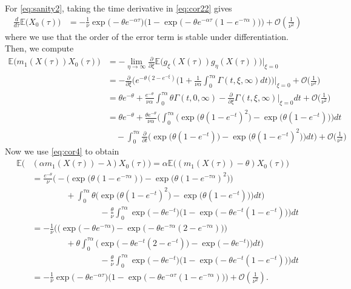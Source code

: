 \documentclass{imsart}
\theoremstyle{plain}
\theoremstyle{definition}
\begin{document}
For \eqref{eq:sanity2}, taking the time derivative in \eqref{eq:cor22}  gives
\begin{align*}
\frac{d}{d\tau}\mathbb E\big(X_0(\tau)\big) & = - \frac1{\nu} \exp\Big(-\theta e^{-\alpha\tau}\Big) \Big( 1 - \exp\Big(- \theta e^{-\alpha\tau}(1 - e^{-\tau\alpha})\Big)  \Big) + \mathcal O\left(\frac{1}{\nu^2}\right)    
\end{align*}
where we use that the order of   the error term is stable under differentiation. Then, we compute
\begin{align*}
    \mathbb E\big(m_1(X(\tau)) X_0(\tau)\big) & = - \lim_{\eta \to\infty} \frac{\partial}{\partial\xi} \mathbb E\big(g_\xi(X(\tau))g_\eta(X(\tau))\big) \Big|_{\xi = 0} \\ & = - \frac{\partial}{\partial\xi} \Big( e^{-\theta(2 - e^{-\xi})}\Big(1  + \frac{1}{\nu \alpha} \int_0^{\tau\alpha} \Gamma(t, \xi, \infty) dt \Big) \Big)\Big|_{\xi = 0} + \mathcal O\Big(\frac{1}{\nu^2}\Big) \\ & = \theta e^{-\theta} + \frac{e^{-\theta}}{\nu \alpha} \int_0^{\tau\alpha} \theta \Gamma(t,0,\infty) - \frac{\partial}{\partial\xi} \Gamma(t,\xi,\infty)\Big|_{\xi = 0} dt + \mathcal O\Big(\frac{1}{\nu^2}\Big)
    \\ & = \theta e^{-\theta} + \frac{\theta e^{-\theta}}{\nu \alpha} \Big( \int_0^{\tau\alpha} \Big( \exp\Big(\theta(1 - e^{-t})^2\Big) - \exp\Big(\theta(1 - e^{-t}) \Big) \Big) dt \\ & \quad - \! \int_0^{\tau\alpha} \frac{\partial}{\partial t} \Big( \exp\Big(\theta(1 - e^{-t})\Big) - \exp\Big(\theta(1 - e^{-t})^2 \Big)\Big) dt \Big) + \mathcal O\Big(\frac{1}{\nu^2}\Big)
\end{align*}
Now we use \eqref{eq:cor4} to obtain
\begin{align*}
\mathbb E\big( & (\alpha m_1(X(\tau)) - \lambda)X_0(\tau)\big) = \alpha \mathbb E\big((m_1(X(\tau)) - \theta)X_0(\tau)\big) \\ 
& 
= \frac{e^{-\theta}}{\nu} \Big( - \Big( \exp\Big(\theta(1 - e^{-\tau\alpha})\Big) - \exp\Big(\theta(1 - e^{-\tau\alpha})^2 \Big)\Big) \\ & \qquad \qquad + \int_0^{\tau\alpha} \theta \Big( \exp\Big(\theta(1 - e^{-t})^2\Big) - \exp\Big(\theta(1 - e^{-t}) \Big) \Big) dt
\Big) \\ &  \qquad \qquad \qquad \qquad - \frac{\theta}{\nu} \int_0^{\tau \alpha} \exp\Big(-\theta e^{-t}\Big)\Big(1 - \exp\Big(-\theta e^{-t}(1 - e^{-t})\Big)\Big) dt
\\ &
= - \frac{1}{\nu} \Big( \Big( \exp\Big(- \theta e^{-\tau\alpha}\Big) - \exp\Big(-\theta e^{-\tau\alpha}(2  - e^{-\tau\alpha}) \Big)\Big) \\ & \qquad \qquad + \theta \int_0^{\tau\alpha} \Big( \exp\Big(-\theta e^{-t}(2 - e^{-t})\Big) - \exp\Big(-\theta e^{-t} \Big) \Big) dt
\Big) \\ &  \qquad \qquad \qquad \qquad - \frac{\theta}{\nu} \int_0^{\tau \alpha} \exp\Big(-\theta e^{-t}\Big)\Big(1 - \exp\Big(-\theta e^{-t}(1 - e^{-t})\Big) \Big)dt
\\ & 
= - \frac1{\nu} \exp\Big(-\theta e^{-\alpha\tau}\Big) \Big( 1 - \exp\Big(- \theta e^{-\alpha\tau}(1 - e^{-\tau\alpha})\Big)  \Big) + \mathcal O\left(\frac{1}{\nu^2}\right).
\end{align*}
\end{document}
